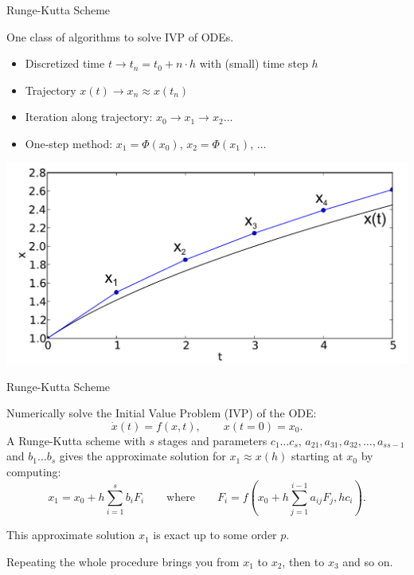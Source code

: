 \documentclass{beamer}
\begin{document}
\begin{frame}{Runge-Kutta Scheme}

One class of algorithms to solve IVP of ODEs.

\begin{itemize}
 \item Discretized time $t \rightarrow t_n = t_0 + n\cdot h$ with (small) time step $h$
 \item Trajectory $x(t) \rightarrow x_n \approx x(t_n)$
 \item Iteration along trajectory: $x_0 \longrightarrow x_1 \longrightarrow x_2 \dots$
 \item One-step method: $x_1 = \Phi(x_0)$, $x_2 = \Phi(x_1)$, $\dots$ 
\end{itemize}

\pause
\begin{center}
  \includegraphics[width=0.8\linewidth]{x_discrete.pdf}
\end{center}

\end{frame}


\begin{frame}{Runge-Kutta Scheme}

Numerically solve the Initial Value Problem (IVP) of the ODE:
\begin{equation}
 \dot x(t) = f(x,t), \qquad x(t=0) = x_0.
\end{equation}
A Runge-Kutta scheme with $s$ stages and parameters $c_1 \dots c_s$, \hspace{.5em}$a_{21}, a_{31} , a_{32} , \dots , a_{s s-1}$ and $b_1 \dots b_s$
gives the approximate solution for $x_1 \approx x(h)$ starting at $x_0$ by computing:
\begin{equation}
 x_1 = x_0 + h\sum_{i=1}^s b_i F_i \qquad \text{where} \qquad F_i = f( x_0 + h\sum_{j=1}^{i-1} a_{ij} F_j , h c_i ).
\end{equation}

This approximate solution $x_1$ is exact up to some order $p$.

Repeating the whole procedure brings you from $x_1$ to $x_2$, then to $x_3$ and so on.

\end{frame}
\end{document}
